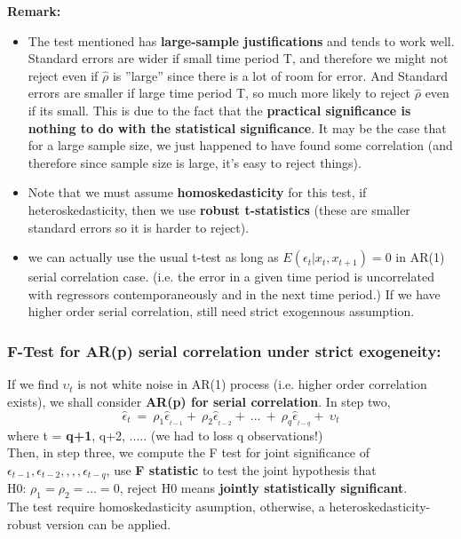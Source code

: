 \documentclass[12pt]{article}
\begin{document}
\noindent
{\color{ForestGreen}\textbf{Remark: }} 
\begin{itemize}
\item 
The test mentioned has \textbf{large-sample justifications} and tends to work well. 
Standard errors are wider if small time period T, and therefore we might not reject even if $\hat{\rho}$ is ”large” since there is a lot of room for error. 
And Standard errors are smaller if large time period T, so much more likely to reject $\hat{\rho}$ even if its small. This is due to the fact that the \textbf{practical significance is nothing to do with the statistical significance}. It may be the case that for a large sample size, we just happened to have found some correlation (and therefore since sample size is large, it’s easy to reject things). 
\item
Note that we must assume \textbf{homoskedasticity} for this test, if heteroskedasticity, then we use \textbf{robust t-statistics} (these are smaller standard errors so it is harder to reject).
\item
we can actually use the usual t-test as long as $E(\epsilon_t|x_t,x_{t+1}) = 0$ in AR(1) serial correlation case. (i.e. the error in a given time period is uncorrelated with regressors contemporaneously and in the next time period.) If we have higher order serial correlation, still need strict exogennous assumption. 
\end{itemize}
\noindent

{\color{RoyalBlue}
\subsubsection{F-Test for AR(p) serial correlation under strict exogeneity:}}
If we find $\upsilon_t$ is not white noise in AR(1) process (i.e. higher order correlation exists), we shall consider \textbf{AR(p) for serial correlation}. In step two, 
$$\hat{\epsilon}_t\ =\ \rho_1\hat{\epsilon}_{_{t-1}}+\ \rho_2\hat{\epsilon}_{_{t-2}}+\ ...\ +\ \rho_q\hat{\epsilon}_{_{t-q}}+\ \upsilon_t$$
where t = \textbf{q+1}, q+2, ..... (we had to loss q observations!)
\\
Then, in step three, we compute the F test for joint significance of $\epsilon_{t-1}, \epsilon_{t-2},,,,\epsilon_{t-q} $, use \textbf{F statistic} to test the joint hypothesis that\\
H0: $\rho_1 = \rho_2 =... = 0$, reject H0 means \textbf{jointly statistically significant}. 
\\

The test require homoskedasticity asumption, otherwise, a heteroskedasticity-robust version can be applied. 
\\
\end{document}
